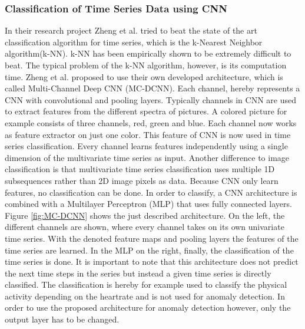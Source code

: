 \subsubsection{Classification of Time Series Data using CNN}
In their research project Zheng et al. \parencite*{Zheng2014} tried to beat the state of the art classification algorithm for time series, which is the k-Nearest Neighbor algorithm(k-NN). k-NN has been empirically shown to be extremely difficult to beat. The typical problem of the k-NN algorithm, however, is its computation time. Zheng et al. proposed to use their own developed architecture, which is called Multi-Channel Deep CNN (MC-DCNN). Each channel, hereby represents a CNN with convolutional and pooling layers.
Typically channels in CNN are used to extract features from the different spectra of pictures. A colored picture for example consists of three channels, red, green and blue. Each channel now works as feature extractor on just one color.
This feature of CNN is now used in time series classification. Every channel learns features independently using a single dimension of the multivariate time series as input. Another difference to image classification is that multivariate time series classification uses multiple 1D subsequences rather than 2D image pixels as data. Because CNN only learn features, no classification can be done. In order to classify, a CNN architecture is combined with a Multilayer Perceptron (MLP) that uses fully connected layers. Figure \ref{fig:MC-DCNN} shows the just described architecture. On the left, the different channels are shown, where every channel takes on its own univariate time series. With the denoted feature maps and pooling layers the features of the time series are learned. In the MLP on the right, finally, the classification of the time series is done. 
It is important to note that this architecture does not predict the next time steps in the series but instead a given time series is directly classified. The classification is hereby for example used to classify the physical activity depending on the heartrate and is not used for anomaly detection. In order to use the proposed architecture for anomaly detection however, only the output layer has to be changed. 

